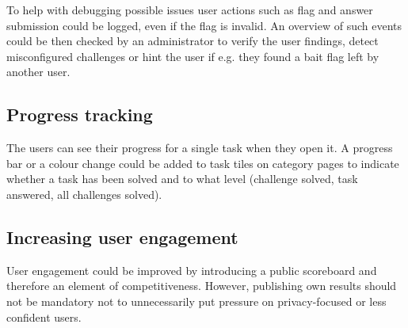 To help with debugging possible issues user actions such as flag and answer submission could be logged, even if the flag is invalid. An overview of such events could be then checked by an administrator to verify the user findings, detect misconfigured challenges or hint the user if e.g. they found a bait flag left by another user.

\subsection{Progress tracking}

The users can see their progress for a single task when they open it. A progress bar or a colour change could be added to task tiles on category pages to indicate whether a task has been solved and to what level (challenge solved, task answered, all challenges solved).

\subsection{Increasing user engagement}

User engagement could be improved by introducing a public scoreboard and therefore an element of competitiveness. However, publishing own results should not be mandatory not to unnecessarily put pressure on privacy-focused or less confident users.
